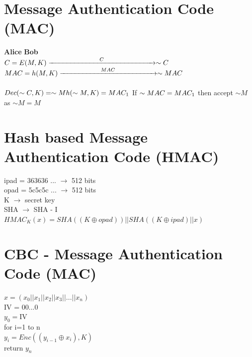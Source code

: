 \documentclass[11pt]{article}
\begin{document}
\section*{Message Authentication Code (MAC)}
\textbf{Alice} \hspace{6.5cm} \textbf{Bob} \\
$C = E(M,K)\xrightarrow{\hspace*{2.5cm}C\hspace*{2.5cm}} \sim C$ \\
$MAC = h(M,K)\xrightarrow{\hspace*{2cm}MAC\hspace*{2cm}} \sim MAC$ \\\\
$Dec( \sim C,K) = \sim M \\
h(\sim M, K) = MAC_{1} \\ $
If $ \sim MAC = MAC_{1} \\ $
then accept $\sim M$ as $\sim M = M $

\section*{Hash based Message Authentication Code (HMAC)}
ipad = 363636 ... $\rightarrow$ 512 bits \\
opad = 5c5c5c ... $\rightarrow$ 512 bits \\
K $\rightarrow$ secret key \\
SHA $\rightarrow$ SHA - I \\
$HMAC_{K}(x) = SHA((K \oplus opad)) || SHA((K \oplus ipad) || x) $

\section*{CBC - Message Authentication Code (MAC)}
$ x = (x_{0} || x_{1} || x_{2} || x_{3} || ... || x_{n})$ \\
IV = 00...0 \\
$y_{0} = $IV \\
for i=1 to n \\
\hspace*{0.5cm} $y_{i} = Enc((y_{i-1} \oplus x_{i}),K)$ \\
return $y_{n}$
\end{document}
